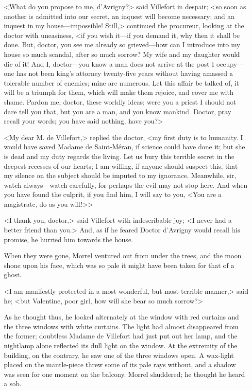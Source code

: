  <What do you propose to me, d'Avrigny?> said Villefort in despair; <so soon as another is admitted into our secret, an inquest will become necessary; and an inquest in my house—impossible! Still,> continued the procureur, looking at the doctor with uneasiness, <if you wish it—if you demand it, why then it shall be done. But, doctor, you see me already so grieved—how can I introduce into my house so much scandal, after so much sorrow? My wife and my daughter would die of it! And I, doctor—you know a man does not arrive at the post I occupy—one has not been king's attorney twenty-five years without having amassed a tolerable number of enemies; mine are numerous. Let this affair be talked of, it will be a triumph for them, which will make them rejoice, and cover me with shame. Pardon me, doctor, these worldly ideas; were you a priest I should not dare tell you that, but you are a man, and you know mankind. Doctor, pray recall your words; you have said nothing, have you?> 

 <My dear M. de Villefort,> replied the doctor, <my first duty is to humanity. I would have saved Madame de Saint-Méran, if science could have done it; but she is dead and my duty regards the living. Let us bury this terrible secret in the deepest recesses of our hearts; I am willing, if anyone should suspect this, that my silence on the subject should be imputed to my ignorance. Meanwhile, sir, watch always—watch carefully, for perhaps the evil may not stop here. And when you have found the culprit, if you find him, I will say to you, <You are a magistrate, do as you will!>> 

 <I thank you, doctor,> said Villefort with indescribable joy; <I never had a better friend than you.> And, as if he feared Doctor d'Avrigny would recall his promise, he hurried him towards the house. 

 When they were gone, Morrel ventured out from under the trees, and the moon shone upon his face, which was so pale it might have been taken for that of a ghost. 

 <I am manifestly protected in a most wonderful, but most terrible manner,> said he; <but Valentine, poor girl, how will she bear so much sorrow?> 

 As he thought thus, he looked alternately at the window with red curtains and the three windows with white curtains. The light had almost disappeared from the former; doubtless Madame de Villefort had just put out her lamp, and the nightlamp alone reflected its dull light on the window. At the extremity of the building, on the contrary, he saw one of the three windows open. A wax-light placed on the mantle-piece threw some of its pale rays without, and a shadow was seen for one moment on the balcony. Morrel shuddered; he thought he heard a sob. 

